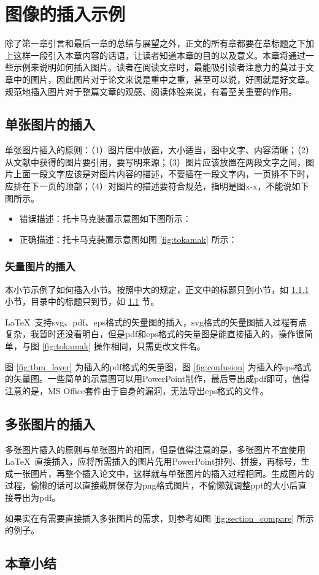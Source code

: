 \chapter{图像的插入示例}
\label{cha:fig_example}
除了第一章引言和最后一章的总结与展望之外，正文的所有章都要在章标题之下加上这样一段引入本章内容的话语，让读者知道本章的目的以及意义。本章将通过一些示例来说明如何插入图片。读者在阅读文章时，最能吸引读者注意力的莫过于文章中的图片，因此图片对于论文来说是重中之重，甚至可以说，好图就是好文章。规范地插入图片对于整篇文章的观感、阅读体验来说，有着至关重要的作用。
\section{单张图片的插入}
\label{sec:fig_singlefig}
单张图片插入的原则：（1）图片居中放置，大小适当，图中文字、内容清晰；（2）从文献中获得的图片要引用，要写明来源；（3）图片应该放置在两段文字之间，图片上面一段文字应该是对图片内容的描述，不要插在一段文字内，一页排不下时，应排在下一页的顶部；（4）对图片的描述要符合规范，指明是图x-x，不能说如下图所示。
\begin{itemize}
\item 错误描述：托卡马克装置示意图如下图所示\cite{xu2016general}：
\item 正确描述：托卡马克装置示意图如图 \ref{fig:tokamak} 所示\cite{xu2016general}：
\end{itemize}


\subsection{矢量图片的插入}
\label{ssec:fig_vecfig}
本小节示例了如何插入小节。按照中大的规定，正文中的标题只到小节，如 \ref{ssec:fig_vecfig} 小节，目录中的标题只到节，如 \ref{sec:fig_singlefig} 节。

\LaTeX\  支持svg、pdf、eps格式的矢量图的插入，svg格式的矢量图插入过程有点复杂，我暂时还没看明白，但是pdf和eps格式的矢量图是能直接插入的，操作很简单，与图 \ref{fig:tokamak} 操作相同，只需更改文件名。

图 \ref{fig:tbm_layer} 为插入的pdf格式的矢量图，图 \ref{fig:confusion} 为插入的eps格式的矢量图。一些简单的示意图可以用PowerPoint制作，最后导出成pdf即可，值得注意的是，MS Office套件由于自身的漏洞，无法导出eps格式的文件。


\section{多张图片的插入}
\label{sec:fig_multifig}
多张图片插入的原则与单张图片的相同，但是值得注意的是，多张图片不宜使用\LaTeX\ 直接插入，应将所需插入的图片先用PowerPoint排列、拼接，再标号，生成一张图片，再整个插入论文中，这样就与单张图片的插入过程相同。生成图片的过程，偷懒的话可以直接截屏保存为png格式图片，不偷懒就调整ppt的大小后直接导出为pdf。



如果实在有需要直接插入多张图片的需求，则参考如图 \ref{fig:section_compare} 所示的例子。

\section{本章小结}
